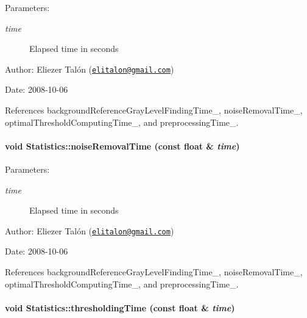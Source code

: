\begin{Desc}
\item[Parameters:]
\begin{description}
\item[{\em time}]Elapsed time in seconds\end{description}
\end{Desc}
\begin{Desc}
\item[Author:]Eliezer Talón (\href{mailto:elitalon@gmail.com}{\tt elitalon@gmail.com}) \end{Desc}
\begin{Desc}
\item[Date:]2008-10-06 \end{Desc}


References backgroundReferenceGrayLevelFindingTime\_\-, noiseRemovalTime\_\-, optimalThresholdComputingTime\_\-, and preprocessingTime\_\-.\hypertarget{class_statistics_dc21ff96ff4ddda9384eb03ac6de20de}{
\paragraph[noiseRemovalTime]{\setlength{\rightskip}{0pt plus 5cm}void Statistics::noiseRemovalTime (const float \& {\em time})}\hfill}
\label{class_statistics_dc21ff96ff4ddda9384eb03ac6de20de}


\begin{Desc}
\item[Parameters:]
\begin{description}
\item[{\em time}]Elapsed time in seconds\end{description}
\end{Desc}
\begin{Desc}
\item[Author:]Eliezer Talón (\href{mailto:elitalon@gmail.com}{\tt elitalon@gmail.com}) \end{Desc}
\begin{Desc}
\item[Date:]2008-10-06 \end{Desc}


References backgroundReferenceGrayLevelFindingTime\_\-, noiseRemovalTime\_\-, optimalThresholdComputingTime\_\-, and preprocessingTime\_\-.\hypertarget{class_statistics_97e33cf2670cb908646fe01b8f1d719a}{
\paragraph[thresholdingTime]{\setlength{\rightskip}{0pt plus 5cm}void Statistics::thresholdingTime (const float \& {\em time})}\hfill}
\label{class_statistics_97e33cf2670cb908646fe01b8f1d719a}


